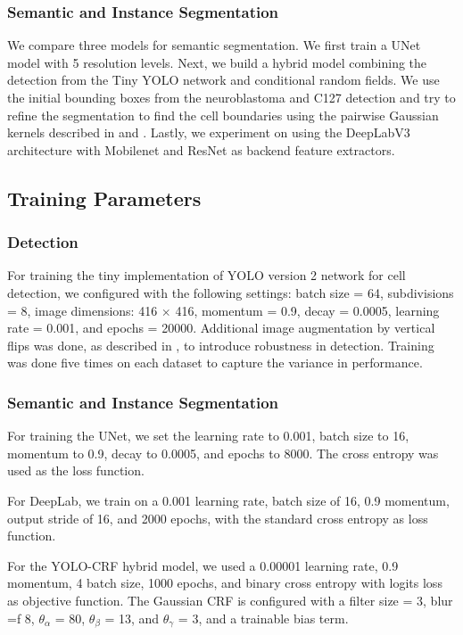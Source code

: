 \documentclass[10pt, journal, compsoc]{IEEEtran}
\begin{document}
\subsubsection{Semantic and Instance Segmentation}
We compare three models for semantic segmentation. We first train a UNet model with 5 resolution levels. Next, we build a hybrid model combining the detection from the Tiny YOLO network and conditional random fields. We use the initial bounding boxes from the neuroblastoma and C127 detection and try to refine the segmentation to find the cell boundaries using the pairwise Gaussian kernels described in \cite{NIPS2011_4296} and \cite{Teichmann2018ConvolutionalCF}. Lastly, we experiment on using the DeepLabV3 architecture with Mobilenet and ResNet as backend feature extractors.
\subsection{Training Parameters}
\subsubsection{Detection}
For training the tiny implementation of YOLO version 2 network for cell detection, we configured with the following settings: batch size = 64, subdivisions = 8, image dimensions: 416 $\times$ 416, momentum = 0.9, decay = 0.0005, learning rate =  0.001, and epochs = 20000. Additional image augmentation by vertical flips was done, as described in \cite{Waithe544833}, to introduce robustness in detection. Training was done five times on each dataset to capture the variance in performance.
\subsubsection{Semantic and Instance Segmentation}
For training the UNet, we set the learning rate to 0.001, batch size to 16, momentum to 0.9, decay to 0.0005, and epochs to 8000. The cross entropy was used as the loss function. 

For DeepLab, we train on a 0.001 learning rate, batch size of 16, 0.9 momentum, output stride of 16, and 2000 epochs, with the standard cross entropy as loss function.

For the YOLO-CRF hybrid model, we used a 0.00001 learning rate, 0.9 momentum, 4 batch size, 1000 epochs, and binary cross entropy with logits loss as objective function. The Gaussian CRF is configured with a filter size = 3, blur =f 8, $\theta_\alpha$ = 80, $\theta_\beta$ = 13, and $\theta_\gamma$ = 3, and a trainable bias term.
\end{document}
